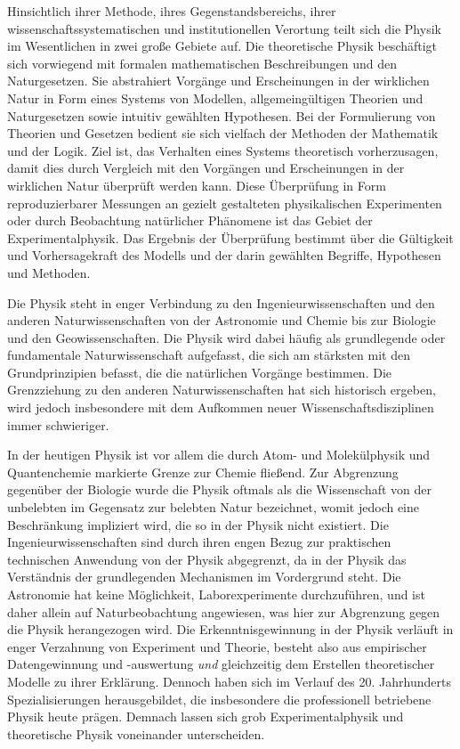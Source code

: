 \documentclass[titlepage, parkskip=full, twocolumn, landscape]{scrartcl}
\begin{document}
Hinsichtlich ihrer Methode, ihres Gegenstandsbereichs, ihrer wissenschaftssystematischen und institutionellen Verortung teilt sich die Physik im Wesentlichen in zwei große Gebiete auf. Die theoretische Physik beschäftigt sich vorwiegend mit formalen mathematischen Beschreibungen und den Naturgesetzen. Sie abstrahiert Vorgänge und Erscheinungen in der wirklichen Natur in Form eines Systems von Modellen, allgemeingültigen Theorien und Naturgesetzen sowie intuitiv gewählten Hypothesen. Bei der Formulierung von Theorien und Gesetzen bedient sie sich vielfach der Methoden der Mathematik und der Logik. Ziel ist, das Verhalten eines Systems theoretisch vorherzusagen, damit dies durch Vergleich mit den Vorgängen und Erscheinungen in der wirklichen Natur überprüft werden kann. Diese Überprüfung in Form reproduzierbarer Messungen an gezielt gestalteten physikalischen Experimenten oder durch Beobachtung natürlicher Phänomene ist das Gebiet der Experimentalphysik. Das Ergebnis der Überprüfung bestimmt über die Gültigkeit und Vorhersagekraft des Modells und der darin gewählten Begriffe, Hypothesen und Methoden.

Die Physik steht in enger Verbindung zu den Ingenieurwissenschaften und den anderen Naturwissenschaften von der Astronomie und Chemie bis zur Biologie und den Geowissenschaften. Die Physik wird dabei häufig als grundlegende oder fundamentale Naturwissenschaft aufgefasst, die sich am stärksten mit den Grundprinzipien befasst, die die natürlichen Vorgänge bestimmen. Die Grenzziehung zu den anderen Naturwissenschaften hat sich historisch ergeben, wird jedoch insbesondere mit dem Aufkommen neuer Wissenschaftsdisziplinen immer schwieriger.

In der heutigen Physik ist vor allem die durch Atom- und Molekülphysik und Quantenchemie markierte Grenze zur Chemie fließend. Zur Abgrenzung gegenüber der Biologie wurde die Physik oftmals als die Wissenschaft von der unbelebten im Gegensatz zur belebten Natur bezeichnet, womit jedoch eine Beschränkung impliziert wird, die so in der Physik nicht existiert. Die Ingenieurwissenschaften sind durch ihren engen Bezug zur praktischen technischen Anwendung von der Physik abgegrenzt, da in der Physik das Verständnis der grundlegenden Mechanismen im Vordergrund steht. Die Astronomie hat keine Möglichkeit, Laborexperimente durchzuführen, und ist daher allein auf Naturbeobachtung angewiesen, was hier zur Abgrenzung gegen die Physik herangezogen wird.
Die Erkenntnisgewinnung in der Physik verläuft in enger Verzahnung von Experiment und Theorie, besteht also aus empirischer Datengewinnung und -auswertung \emph{und} gleichzeitig dem Erstellen theoretischer Modelle zu ihrer Erklärung. Dennoch haben sich im Verlauf des 20. Jahrhunderts Spezialisierungen herausgebildet, die insbesondere die professionell betriebene Physik heute prägen. Demnach lassen sich grob Experimentalphysik und theoretische Physik voneinander unterscheiden.
\end{document}
